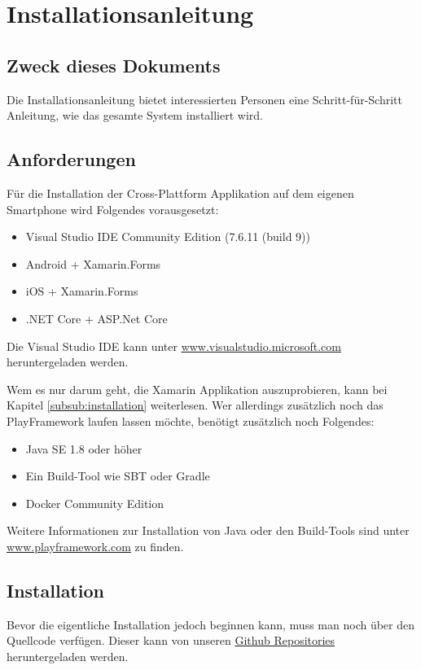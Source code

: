 \section{Installationsanleitung}

\subsection{Zweck dieses Dokuments}
Die Installationsanleitung bietet interessierten Personen eine Schritt-für-Schritt Anleitung, wie das gesamte System installiert wird.
 
\subsection{Anforderungen}
Für die Installation der Cross-Plattform Applikation auf dem eigenen Smartphone wird Folgendes vorausgesetzt:

\begin{itemize}
  \item Visual Studio IDE Community Edition (7.6.11 (build 9))
  \item Android + Xamarin.Forms
  \item iOS + Xamarin.Forms
  \item .NET Core + ASP.Net Core
\end{itemize}
Die Visual Studio IDE kann unter \href{https://visualstudio.microsoft.com/de/vs/}{www.visualstudio.microsoft.com} heruntergeladen werden. 

Wem es nur darum geht, die Xamarin Applikation auszuprobieren, kann bei Kapitel \ref{subsub:installation} weiterlesen. Wer allerdings zusätzlich noch das PlayFramework laufen lassen möchte, benötigt zusätzlich noch Folgendes:

\begin{itemize}
  \item Java SE 1.8 oder höher
  \item Ein Build-Tool wie SBT oder Gradle
  \item Docker Community Edition
\end{itemize}
Weitere Informationen zur Installation von Java oder den Build-Tools sind unter \href{https://www.playframework.com/documentation/2.6.x/Requirements}{www.playframework.com} zu finden.


\subsection{Installation}
Bevor die eigentliche Installation jedoch beginnen kann, muss man noch über den Quellcode verfügen. Dieser kann von unseren \href{https://github.com/BrainingOutOfBox}{Github Repositories} heruntergeladen werden.

